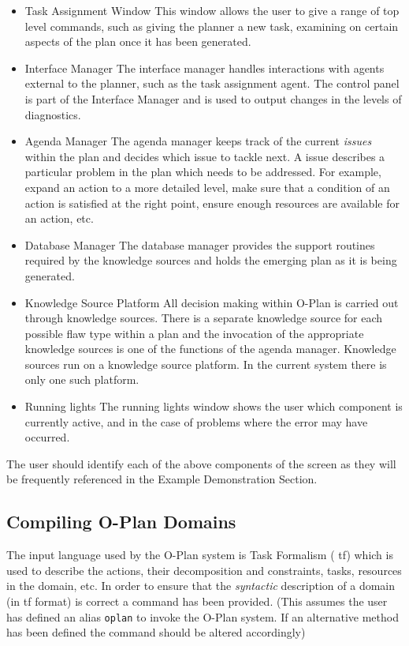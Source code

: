 \begin{itemize}
\item Task Assignment Window \newline
This window allows the user to give a range of top level commands,
such as giving the planner a new task, examining on certain aspects of
the plan once it has been generated.
\item Interface Manager \newline
The interface manager handles interactions with agents external to the
planner, such as the task assignment agent. The control panel is part
of the Interface Manager and is used to output changes in the levels
of diagnostics.
\item Agenda Manager \newline
The agenda manager keeps track of the current {\em issues} within the
plan and decides which issue to tackle next. A issue describes a
particular problem in the plan which needs to be addressed. For
example, expand an action to a more detailed level, make sure that a
condition of an action is satisfied at the right point, ensure enough
resources are available for an action, etc.
\item Database Manager \newline
The database manager provides the support routines required by the
knowledge sources and holds the emerging plan as it is being
generated.
\item Knowledge Source Platform \newline
All decision making within O-Plan is carried out through knowledge
sources. There is a separate knowledge source for each possible flaw
type within a plan and the invocation of the appropriate knowledge
sources is one of the functions of the agenda manager. Knowledge
sources run on a knowledge source platform. In the current system there
is only one such platform.
\item Running lights \newline
The running lights window shows the user which component is currently
active, and in the case of problems where the error may have occurred. 
\end{itemize}

The user should identify each of the above components of the screen as
they will be frequently referenced in the Example Demonstration
Section. 

\subsection{\protect\label{tfc}Compiling O-Plan Domains}
The input language used by the O-Plan system is Task Formalism ({\sc
tf}) which is used to describe the actions, their decomposition and
constraints, tasks, resources in the domain, etc. In order to ensure
that the {\em syntactic} description of a domain (in {\sc tf} format)
is correct a command has been provided. (This assumes the user has
defined an alias {\tt oplan} to invoke the O-Plan system. If an
alternative method has been defined the command should be altered
accordingly)

